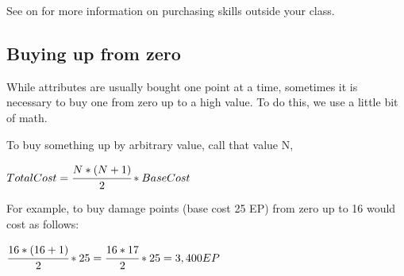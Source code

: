 See  on  for more information on purchasing skills outside your class.
\subsection{Buying up from zero}
While attributes are usually bought one point at a time, sometimes it is necessary to buy one from zero up to a high value. To do this, we use a little bit of math.

To buy something up by arbitrary value, call that value N,

\begin{normbox}
\large
$Total Cost = \cfrac{N * (N+1)}{2} * Base Cost$
\end{normbox}

For example, to buy damage points (base cost 25 EP) from zero up to 16 would cost as follows:

\begin{normbox}
\large
$\cfrac{16 * (16+1)}{2} * 25 = \cfrac{16*17}{2} * 25 = 3,400 EP$
\end{normbox}

